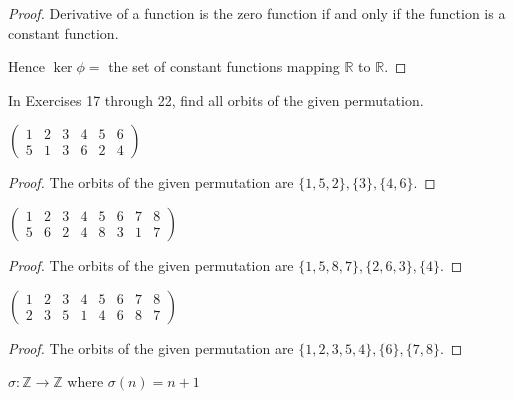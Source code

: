 \begin{proof}
    Derivative of a function is the zero function if and only if the function is a constant function.

    Hence $\ker\phi =$ the set of constant functions mapping $\mathbb{R}$ to $\mathbb{R}$.
\end{proof}

In Exercises 17 through 22, find all orbits of the given permutation.

\newpage
\begin{exercise}
    $\begin{pmatrix}
            1 & 2 & 3 & 4 & 5 & 6 \\
            5 & 1 & 3 & 6 & 2 & 4
        \end{pmatrix}$
\end{exercise}

\begin{proof}
    The orbits of the given permutation are $\{ 1, 5, 2 \}, \{ 3 \}, \{ 4, 6 \}$.
\end{proof}

\newpage
\begin{exercise}
    $\begin{pmatrix}
            1 & 2 & 3 & 4 & 5 & 6 & 7 & 8 \\
            5 & 6 & 2 & 4 & 8 & 3 & 1 & 7
        \end{pmatrix}$
\end{exercise}

\begin{proof}
    The orbits of the given permutation are $\{ 1, 5, 8, 7 \}, \{ 2, 6, 3 \}, \{ 4 \}$.
\end{proof}

\newpage
\begin{exercise}
    $\begin{pmatrix}
            1 & 2 & 3 & 4 & 5 & 6 & 7 & 8 \\
            2 & 3 & 5 & 1 & 4 & 6 & 8 & 7
        \end{pmatrix}$
\end{exercise}

\begin{proof}
    The orbits of the given permutation are $\{ 1, 2, 3, 5, 4 \}, \{ 6 \}, \{ 7, 8 \}$.
\end{proof}

\newpage
\begin{exercise}
    $\sigma: \mathbb{Z} \to \mathbb{Z}$ where $\sigma(n) = n + 1$
\end{exercise}


